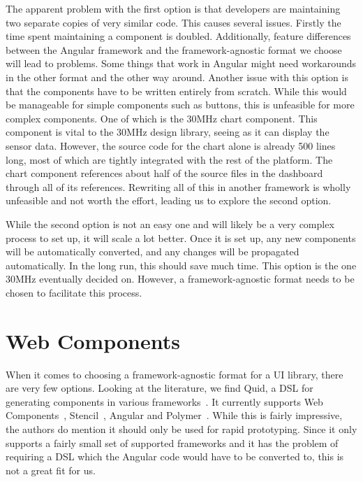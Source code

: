 The apparent problem with the first option is that developers are maintaining two separate copies of very similar code. This causes several issues. Firstly the time spent maintaining a component is doubled. Additionally, feature differences between the Angular framework and the framework-agnostic format we choose will lead to problems. Some things that work in Angular might need workarounds in the other format and the other way around. Another issue with this option is that the components have to be written entirely from scratch. While this would be manageable for simple components such as buttons, this is unfeasible for more complex components. One of which is the 30MHz chart component. This component is vital to the 30MHz design library, seeing as it can display the sensor data. However, the source code for the chart alone is already 500 lines long, most of which are tightly integrated with the rest of the platform. The chart component references about half of the source files in the dashboard through all of its references. Rewriting all of this in another framework is wholly unfeasible and not worth the effort, leading us to explore the second option.

While the second option is not an easy one and will likely be a very complex process to set up, it will scale a lot better. Once it is set up, any new components will be automatically converted, and any changes will be propagated automatically. In the long run, this should save much time. This option is the one 30MHz eventually decided on. However, a framework-agnostic format needs to be chosen to facilitate this process.

\section{Web Components}\label{sec:bg:webcomponents}
When it comes to choosing a framework-agnostic format for a UI library, there are very few options. Looking at the literature, we find Quid, a DSL for generating components in various frameworks~. It currently supports Web Components~, Stencil~, Angular and Polymer~. While this is fairly impressive, the authors do mention it should only be used for rapid prototyping. Since it only supports a fairly small set of supported frameworks and it has the problem of requiring a DSL which the Angular code would have to be converted to, this is not a great fit for us.


